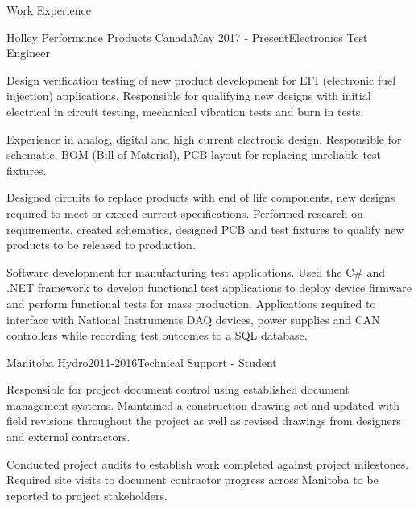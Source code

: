\documentclass{resume} %
\begin{document}
\begin{rSection}{Work Experience}
\begin{rSubsection}{Holley Performance Products Canada}{May 2017 - Present}{Electronics Test Engineer}{}
    
    \item Design verification testing of new product development for EFI (electronic fuel injection) applications. Responsible for qualifying new designs with initial electrical in circuit testing, mechanical vibration tests and burn in tests.

    \item Experience in analog, digital and high current electronic design. Responsible for schematic, BOM (Bill of Material), PCB layout for replacing unreliable test fixtures. 

    \item Designed circuits to replace products with end of life components, new designs required to meet or exceed current specifications. Performed research on requirements, created schematics, designed PCB and test fixtures to qualify new products to be released to production.

    \item Software development for manufacturing test applications. Used the C\# and .NET framework to develop functional test applications to deploy device firmware and perform functional tests for mass production. Applications required to interface with National Instruments DAQ devices, power supplies and CAN controllers while recording test outcomes to a SQL database.
    
\end{rSubsection}

\begin{rSubsection}{Manitoba Hydro}{2011-2016}{Technical Support - Student}{}

    \item Responsible for project document control using established document management systems. Maintained a construction drawing set and updated with field revisions throughout the project as well as revised drawings from designers and external contractors. 

    \item Conducted project audits to establish work completed against project milestones. Required site visits to document contractor progress across Manitoba to be reported to project stakeholders.
    
\end{rSubsection}
\end{rSection}
\end{document}
